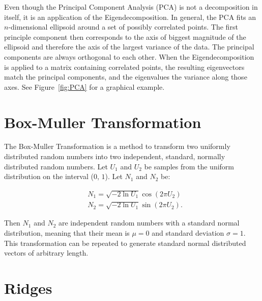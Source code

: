 Even though the Principal Component Analysis (PCA) is not a decomposition
in itself, it is an application of the Eigendecomposition. In general,
the PCA fits an $n$-dimensional ellipsoid around a set of possibly
correlated points. The first principle component then corresponds to the
axis of biggest magnitude of the ellipsoid and therefore the axis of the
largest variance of the data. The principal components are always
orthogonal to each other. When the Eigendecomposition is applied to
a matrix containing correlated points, the resulting eigenvectors match
the principal components, and the eigenvalues the variance along those
axes. See Figure~\ref{fig:PCA} for a graphical example.

\section{Box-Muller Transformation}\label{sec:BM}

The Box-Muller Transformation is a method to transform two uniformly
distributed random numbers into two independent, standard, normally
distributed random numbers. Let $U_1$ and $U_2$ be samples from the
uniform distribution on the interval ($0$, $1$). Let $N_1$ and $N_2$ be:

\begin{align}
  &N_1 = \sqrt{-2 \ln{U_1}} \cos (2 \pi U_2) \\
  &N_2 = \sqrt{-2 \ln{U_1}} \sin (2 \pi U_2).
\end{align}

\noindent Then $N_1$ and $N_2$ are independent random numbers with a
standard normal distribution, meaning that their mean is $\mu = 0$ and
standard deviation $\sigma = 1$. This transformation can be repeated to
generate standard normal distributed vectors of arbitrary length.

\section{Ridges}\label{sec:Ridges}

